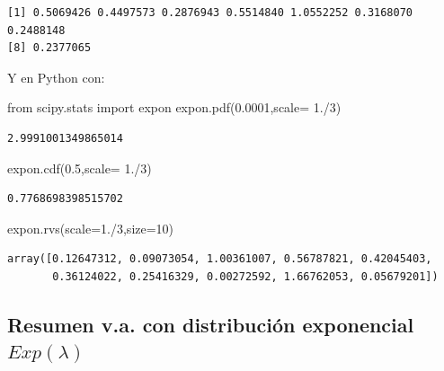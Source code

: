 \documentclass[
  letterpaper,
  DIV=11,
  numbers=noendperiod]{scrreprt}
\newenvironment{Shaded}{\begin{snugshade}}{\end{snugshade}}
\newcommand{\DecValTok}[1]{\textcolor[rgb]{0.68,0.00,0.00}{#1}}
\newcommand{\FloatTok}[1]{\textcolor[rgb]{0.68,0.00,0.00}{#1}}
\newcommand{\ImportTok}[1]{\textcolor[rgb]{0.00,0.46,0.62}{#1}}
\newcommand{\NormalTok}[1]{\textcolor[rgb]{0.00,0.23,0.31}{#1}}
\newcommand{\OperatorTok}[1]{\textcolor[rgb]{0.37,0.37,0.37}{#1}}
\begin{document}
\begin{verbatim}
[1] 0.5069426 0.4497573 0.2876943 0.5514840 1.0552252 0.3168070 0.2488148
[8] 0.2377065
\end{verbatim}

Y en Python con:

\begin{Shaded}
\begin{Highlighting}[]
\ImportTok{from}\NormalTok{ scipy.stats }\ImportTok{import}\NormalTok{ expon}
\NormalTok{expon.pdf(}\FloatTok{0.0001}\NormalTok{,scale}\OperatorTok{=} \FloatTok{1.}\OperatorTok{/}\DecValTok{3}\NormalTok{)}
\end{Highlighting}
\end{Shaded}

\begin{verbatim}
2.9991001349865014
\end{verbatim}

\begin{Shaded}
\begin{Highlighting}[]
\NormalTok{expon.cdf(}\FloatTok{0.5}\NormalTok{,scale}\OperatorTok{=} \FloatTok{1.}\OperatorTok{/}\DecValTok{3}\NormalTok{) }
\end{Highlighting}
\end{Shaded}

\begin{verbatim}
0.7768698398515702
\end{verbatim}

\begin{Shaded}
\begin{Highlighting}[]
\NormalTok{expon.rvs(scale}\OperatorTok{=}\FloatTok{1.}\OperatorTok{/}\DecValTok{3}\NormalTok{,size}\OperatorTok{=}\DecValTok{10}\NormalTok{)}
\end{Highlighting}
\end{Shaded}

\begin{verbatim}
array([0.12647312, 0.09073054, 1.00361007, 0.56787821, 0.42045403,
       0.36124022, 0.25416329, 0.00272592, 1.66762053, 0.05679201])
\end{verbatim}

\subsection{\texorpdfstring{Resumen v.a. con distribución exponencial
\(Exp(\lambda)\)}{Resumen v.a. con distribución exponencial Exp(\textbackslash lambda)}}\label{resumen-v.a.-con-distribuciuxf3n-exponencial-explambda}
\end{document}
